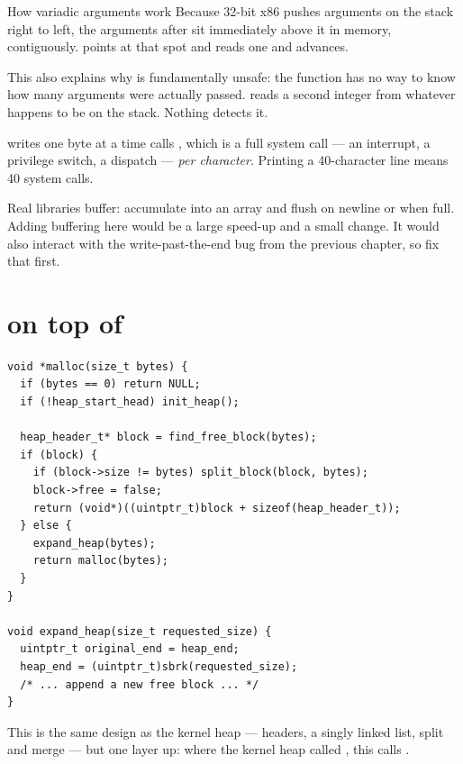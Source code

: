 \begin{concept}{How variadic arguments work}
Because 32-bit x86 pushes arguments on the stack right to left, the arguments after  sit
immediately above it in memory, contiguously.  points at that spot and 
reads one and advances.

This also explains why  is fundamentally unsafe: the function has no way to know how
many arguments were actually passed.  reads a second integer from whatever
happens to be on the stack. Nothing detects it.
\end{concept}

\begin{warn}{ writes one byte at a time}
 calls , which is a full system call --- an interrupt, a
privilege switch, a dispatch --- \emph{per character}. Printing a 40-character line means 40 system
calls.

Real libraries buffer: accumulate into an array and flush on newline or when full. Adding buffering
here would be a large speed-up and a small change. It would also interact with the write-past-the-end
bug from the previous chapter, so fix that first.
\end{warn}

\section{ on top of }

\begin{lstlisting}[style=c]
void *malloc(size_t bytes) {
  if (bytes == 0) return NULL;
  if (!heap_start_head) init_heap();

  heap_header_t* block = find_free_block(bytes);
  if (block) {
    if (block->size != bytes) split_block(block, bytes);
    block->free = false;
    return (void*)((uintptr_t)block + sizeof(heap_header_t));
  } else {
    expand_heap(bytes);
    return malloc(bytes);
  }
}

void expand_heap(size_t requested_size) {
  uintptr_t original_end = heap_end;
  heap_end = (uintptr_t)sbrk(requested_size);
  /* ... append a new free block ... */
}
\end{lstlisting}

This is the same design as the kernel heap --- headers, a singly linked list, split and merge --- but
one layer up: where the kernel heap called , this calls .

